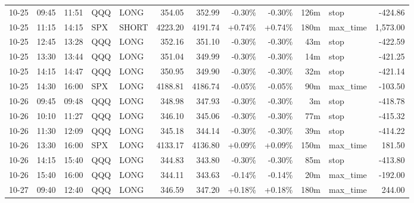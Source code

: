 \documentclass[11pt,a4paper,twoside]{article}
\begin{document}
\begin{center}
\begin{longtable}{>{\color{txtmain}}l l l l l r r r r r >{\color{txtmain}}l r}
10-25 & 09:45 & 11:51 & QQQ & LONG & 354.05 & 352.99 & \textcolor{lossred}{-0.30\%} & \textcolor{lossred}{-0.30\%} & 126m & stop & \textcolor{lossred}{-424.86} \\
10-25 & 11:15 & 14:15 & SPX & SHORT & 4223.20 & 4191.74 & \textcolor{wingreen}{+0.74\%} & \textcolor{wingreen}{+0.74\%} & 180m & max\_time & \textcolor{wingreen}{1,573.00} \\
10-25 & 12:45 & 13:28 & QQQ & LONG & 352.16 & 351.10 & \textcolor{lossred}{-0.30\%} & \textcolor{lossred}{-0.30\%} & 43m & stop & \textcolor{lossred}{-422.59} \\
10-25 & 13:30 & 13:44 & QQQ & LONG & 351.04 & 349.99 & \textcolor{lossred}{-0.30\%} & \textcolor{lossred}{-0.30\%} & 14m & stop & \textcolor{lossred}{-421.25} \\
10-25 & 14:15 & 14:47 & QQQ & LONG & 350.95 & 349.90 & \textcolor{lossred}{-0.30\%} & \textcolor{lossred}{-0.30\%} & 32m & stop & \textcolor{lossred}{-421.14} \\
10-25 & 14:30 & 16:00 & SPX & LONG & 4188.81 & 4186.74 & \textcolor{lossred}{-0.05\%} & \textcolor{lossred}{-0.05\%} & 90m & max\_time & \textcolor{lossred}{-103.50} \\
10-26 & 09:45 & 09:48 & QQQ & LONG & 348.98 & 347.93 & \textcolor{lossred}{-0.30\%} & \textcolor{lossred}{-0.30\%} & 3m & stop & \textcolor{lossred}{-418.78} \\
10-26 & 10:10 & 11:27 & QQQ & LONG & 346.10 & 345.06 & \textcolor{lossred}{-0.30\%} & \textcolor{lossred}{-0.30\%} & 77m & stop & \textcolor{lossred}{-415.32} \\
10-26 & 11:30 & 12:09 & QQQ & LONG & 345.18 & 344.14 & \textcolor{lossred}{-0.30\%} & \textcolor{lossred}{-0.30\%} & 39m & stop & \textcolor{lossred}{-414.22} \\
10-26 & 13:30 & 16:00 & SPX & LONG & 4133.17 & 4136.80 & \textcolor{wingreen}{+0.09\%} & \textcolor{wingreen}{+0.09\%} & 150m & max\_time & \textcolor{wingreen}{181.50} \\
10-26 & 14:15 & 15:40 & QQQ & LONG & 344.83 & 343.80 & \textcolor{lossred}{-0.30\%} & \textcolor{lossred}{-0.30\%} & 85m & stop & \textcolor{lossred}{-413.80} \\
10-26 & 15:40 & 16:00 & QQQ & LONG & 344.11 & 343.63 & \textcolor{lossred}{-0.14\%} & \textcolor{lossred}{-0.14\%} & 20m & max\_time & \textcolor{lossred}{-192.00} \\
10-27 & 09:40 & 12:40 & QQQ & LONG & 346.59 & 347.20 & \textcolor{wingreen}{+0.18\%} & \textcolor{wingreen}{+0.18\%} & 180m & max\_time & \textcolor{wingreen}{244.00} \\

\end{longtable}
\end{center}
\end{document}
